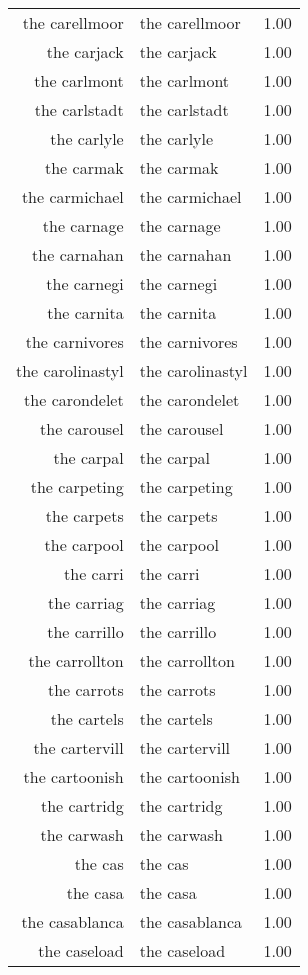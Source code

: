 \begin{table}[ht]
\begin{tabular}{rlr}
  the carellmoor & the carellmoor & 1.00 \\ 
  the carjack & the carjack & 1.00 \\ 
  the carlmont & the carlmont & 1.00 \\ 
  the carlstadt & the carlstadt & 1.00 \\ 
  the carlyle & the carlyle & 1.00 \\ 
  the carmak & the carmak & 1.00 \\ 
  the carmichael & the carmichael & 1.00 \\ 
  the carnage & the carnage & 1.00 \\ 
  the carnahan & the carnahan & 1.00 \\ 
  the carnegi & the carnegi & 1.00 \\ 
  the carnita & the carnita & 1.00 \\ 
  the carnivores & the carnivores & 1.00 \\ 
  the carolinastyl & the carolinastyl & 1.00 \\ 
  the carondelet & the carondelet & 1.00 \\ 
  the carousel & the carousel & 1.00 \\ 
  the carpal & the carpal & 1.00 \\ 
  the carpeting & the carpeting & 1.00 \\ 
  the carpets & the carpets & 1.00 \\ 
  the carpool & the carpool & 1.00 \\ 
  the carri & the carri & 1.00 \\ 
  the carriag & the carriag & 1.00 \\ 
  the carrillo & the carrillo & 1.00 \\ 
  the carrollton & the carrollton & 1.00 \\ 
  the carrots & the carrots & 1.00 \\ 
  the cartels & the cartels & 1.00 \\ 
  the cartervill & the cartervill & 1.00 \\ 
  the cartoonish & the cartoonish & 1.00 \\ 
  the cartridg & the cartridg & 1.00 \\ 
  the carwash & the carwash & 1.00 \\ 
  the cas & the cas & 1.00 \\ 
  the casa & the casa & 1.00 \\ 
  the casablanca & the casablanca & 1.00 \\ 
  the caseload & the caseload & 1.00 \\ 

\end{tabular}
\end{table}
